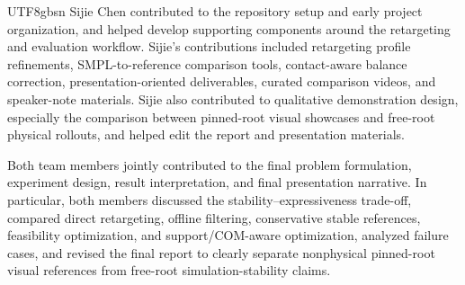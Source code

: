 \documentclass[conference]{IEEEtran}
\begin{document}
\begin{CJK*}{UTF8}{gbsn}
Sijie Chen contributed to the repository setup and early project organization, and helped develop supporting components around the retargeting and evaluation workflow. Sijie's contributions included retargeting profile refinements, SMPL-to-reference comparison tools, contact-aware balance correction, presentation-oriented deliverables, curated comparison videos, and speaker-note materials. Sijie also contributed to qualitative demonstration design, especially the comparison between pinned-root visual showcases and free-root physical rollouts, and helped edit the report and presentation materials.

Both team members jointly contributed to the final problem formulation, experiment design, result interpretation, and final presentation narrative. In particular, both members discussed the stability--expressiveness trade-off, compared direct retargeting, offline filtering, conservative stable references, feasibility optimization, and support/COM-aware optimization, analyzed failure cases, and revised the final report to clearly separate nonphysical pinned-root visual references from free-root simulation-stability claims.




\end{CJK*}
\end{document}
